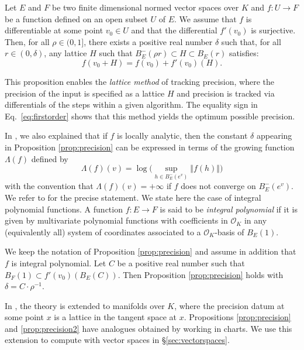 \documentclass{sig-alternate}
\renewcommand{\O}{\mathcal O}
\newcommand{\OK}{\mathcal{O}_K}
\begin{document}
\begin{prop}
\label{prop:precision}
Let $E$ and $F$ be two finite dimensional normed vector spaces over $K$ 
and $f : U \rightarrow F$ be a function defined on an open subset $U$ of 
$E$. We assume that $f$ is differentiable at some point $v_0 \in U$ and 
that the differential $f'(v_0)$ is surjective.
Then, for all $\rho \in (0, 1]$, there exists a positive real
number $\delta$ such that, for all $r \in (0, \delta)$, any lattice
$H$ such that $B^-_E(\rho r) \subset H \subset B^{\phantom -}_E(r)$ 
satisfies:
\begin{equation}
\label{eq:firstorder}
f(v_0 + H) = f(v_0) + f'(v_0) (H).
\end{equation}
\end{prop}

This proposition enables the \emph{lattice method} of tracking precision,
where the precision of the input is specified as a lattice $H$ and precision
is tracked via differentials of the steps within a given algorithm.
The equality sign in Eq.~\eqref{eq:firstorder} shows that this method
yields the optimum possible precision.

In \cite{caruso-roe-vaccon:14a}, we also explained that if 
$f$ is locally analytic, then the constant $\delta$ appearing in
Proposition \ref{prop:precision} can be expressed in terms of the
growing function $\Lambda(f)$ defined by
\[
\textstyle \Lambda(f)(v) = 
\log \big( \sup_{h \in B^-_E(e^v)} \Vert 
f(h) \Vert \big)
\]
with the convention that $\Lambda(f)(v) = +\infty$ if $f$ does not
converge on $B^-_E(e^v)$.
We refer to \cite[Proposition 3.12]{caruso-roe-vaccon:14a} for the
precise statement.  We state here the case of
integral polynomial functions. A function $f : E \to F$ is said to be
\emph{integral polynomial} if it is given by multivariate polynomial 
functions with coefficients in $\O_K$ in any (equivalently all) system 
of coordinates associated to a $\OK$-basis of $B_E(1)$.

\begin{prop}
\label{prop:precision2}
We keep the notation of Proposition \ref{prop:precision} and assume 
in addition that $f$ is integral polynomial. Let $C$ be a positive real
number such that $B_F(1) \subset f'(v_0)(B_E(C))$. 
Then Proposition \ref{prop:precision} holds with $\delta = C \cdot
\rho^{-1}$.
\end{prop}

In \cite[Appendix A]{caruso-roe-vaccon:14a}, the theory is extended 
to manifolds over $K$, where the precision 
datum at some point $x$ is a lattice in the tangent space at $x$. 
Propositions \ref{prop:precision} and \ref{prop:precision2} have
analogues obtained by working in charts.  We use this extension
to compute with vector spaces in \S \ref{sec:vectorspaces}.
\end{document}

